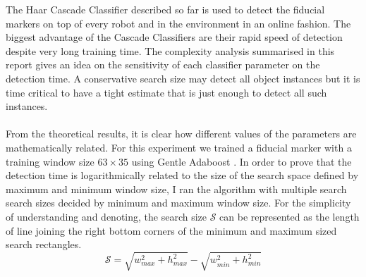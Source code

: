 The Haar Cascade Classifier \cite{violajones} described so far is used to detect the fiducial markers on top of every robot and in the environment in an online fashion. The biggest advantage of the Cascade Classifiers are their rapid speed of detection despite very long training time. The complexity analysis summarised in this report gives an idea on the sensitivity of each classifier parameter on the detection time. A conservative search size may detect all object instances but it is time critical to have a tight estimate that is just enough to detect all such instances.
\paragraph{}
From the theoretical results, it is clear how different values of the parameters are mathematically related. For this experiment we trained a fiducial marker with a training window size $63 \times 35$ using Gentle Adaboost \cite{classifier6,classifier7}.  In order to prove that the detection time is logarithmically related to the size of the search space defined by maximum and minimum window size, I ran the algorithm with multiple search search sizes decided by minimum and maximum window size. For the simplicity of understanding and denoting, the search size $\mathcal{S}$ can be represented as the length of line joining the right bottom corners of the minimum and maximum sized search rectangles.
\begin{equation}
\mathcal{S} = \sqrt{w_{max}^2 + h_{max}^2} - \sqrt{w_{min}^2 + h_{min}^2}
\label{eq12}
\end{equation}


